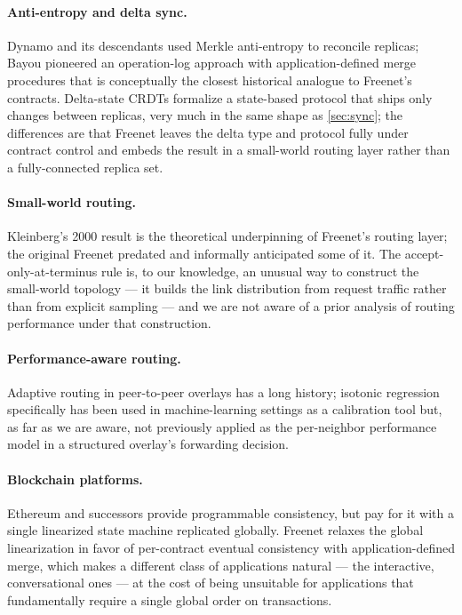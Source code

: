 \paragraph{Anti-entropy and delta sync.} Dynamo \citep{decandia2007dynamo} and its descendants used Merkle anti-entropy to reconcile replicas; Bayou \citep{terry1995bayou} pioneered an operation-log approach with application-defined merge procedures that is conceptually the closest historical analogue to Freenet's contracts. Delta-state CRDTs \citep{almeida2018delta} formalize a state-based protocol that ships only changes between replicas, very much in the same shape as \cref{sec:sync}; the differences are that Freenet leaves the delta type and protocol fully under contract control and embeds the result in a small-world routing layer rather than a fully-connected replica set.

\paragraph{Small-world routing.} Kleinberg's 2000 result \citep{kleinberg2000small} is the theoretical underpinning of Freenet's routing layer; the original Freenet \citep{clarke2001freenet} predated and informally anticipated some of it. The accept-only-at-terminus rule is, to our knowledge, an unusual way to construct the small-world topology --- it builds the link distribution from request traffic rather than from explicit sampling --- and we are not aware of a prior analysis of routing performance under that construction.

\paragraph{Performance-aware routing.} Adaptive routing in peer-to-peer overlays has a long history; isotonic regression specifically has been used in machine-learning settings as a calibration tool \citep{deleeuw2009isotone} but, as far as we are aware, not previously applied as the per-neighbor performance model in a structured overlay's forwarding decision.

\paragraph{Blockchain platforms.} Ethereum \citep{wood2014ethereum} and successors provide programmable consistency, but pay for it with a single linearized state machine replicated globally. Freenet relaxes the global linearization in favor of per-contract eventual consistency with application-defined merge, which makes a different class of applications natural --- the interactive, conversational ones --- at the cost of being unsuitable for applications that fundamentally require a single global order on transactions.

